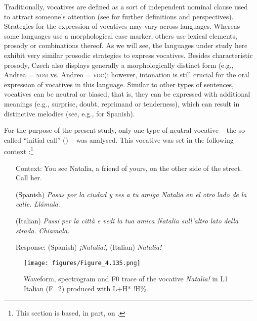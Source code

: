 Traditionally, vocatives are defined as a sort of independent nominal clause used to attract someone’s attention (see  \citealt{SonnenhauserNoelAzizHanna2013, HuttenlauchEtAl2018} for further definitions and perspectives). Strategies for the expression of vocatives may vary across languages. Whereas some languages use a morphological case marker, others use lexical elements, prosody or combinations thereof. As we will see, the languages under study here exhibit very similar prosodic strategies to express vocatives. Besides characteristic prosody, Czech also displays generally a morphologically distinct form (e.g., Andrea = \textsc{nom} vs. Andreo = \textsc{voc}); however, intonation is still crucial for the oral expression of vocatives in this language. Similar to other types of sentences, vocatives can be neutral or biased, that is, they can be expressed with additional meanings (e.g., surprise, doubt, reprimand or tenderness), which can result in distinctive melodies (see, e.g.,  \citealt{VelásquezUpegui2013, Borràs-ComesEtAl2015} for Spanish).


For the purpose of the present study, only one type of neutral vocative -- the so-called “initial call” (\citealt{FrotaPrieto2015}) -- was analysed. This vocative was set in the following context :\footnote{This section is based, in part, on \citealt{Pešková2019}.}


\begin{exe}
\ex\label{ex:4:20}
\begin{itemize}[leftmargin=2cm, labelwidth=1.6cm, align=parleft]
\item[Context:]  You see Natalia, a friend of yours, on the other side of the street. Call her.
\item[(Spanish)]  \textit{Pasas por la ciudad y ves a tu amiga Natalia en el otro lado de la calle. Llámala.}
\item[(Italian)]   \textit{Passi per la città e vedi la tua amica Natalia sull’altro lato della strada. Chiamala.}
\item[Response:]  (Spanish) \textit{¡Natalia!,} (Italian) \textit{Natalia!}
\end{itemize}
\end{exe}

\begin{figure}[p]
\texttt{[image: figures/Figure\_4.135.png]}
\caption{Waveform, spectrogram and F0 trace of the vocative \textit{Natalia!} in L1 Italian (F\_2) produced with L+H* !H\%.}
\label{fig:4.135}
\end{figure}

